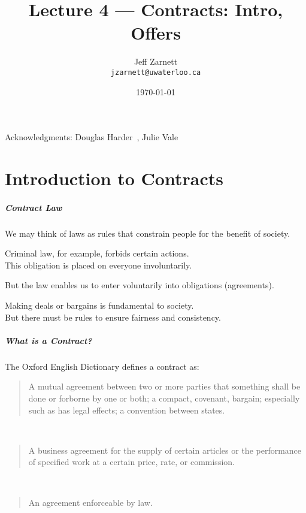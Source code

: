 

\title{Lecture 4 --- Contracts: Intro, Offers }

\author{Jeff Zarnett \\ \small \texttt{jzarnett@uwaterloo.ca}}
\date{\today}




\begin{frame}
  \titlepage

\begin{center}
  \small{Acknowledgments: Douglas Harder~\cite{dwh}, Julie Vale~\cite{jv}}
  \end{center}
\end{frame}


\part{Introduction to Contracts}

\begin{frame}
\partpage
\end{frame}

\begin{frame}
\frametitle{Contract Law}

We may think of laws as rules that constrain people for the benefit of society.

Criminal law, for example, forbids certain actions.\\
\quad This obligation is placed on everyone involuntarily.

But the law enables us to enter voluntarily into obligations (agreements). 

Making deals or bargains is fundamental to society.\\
\quad But there must be rules to ensure fairness and consistency.

\end{frame}



\begin{frame}
\frametitle{What is a Contract?}

The Oxford English Dictionary defines a contract as:

\begin{quote}
	A mutual agreement between two or more parties that something shall be done or forborne by one or both; a compact, covenant, bargain; especially such as has legal effects; a convention between states.
\end{quote}~\\
\begin{quote}
	A business agreement for the supply of certain articles or the performance of specified work at a certain price, rate, or commission.
\end{quote}~\\
\begin{quote}
	An agreement enforceable by law.
\end{quote}


\end{frame}



